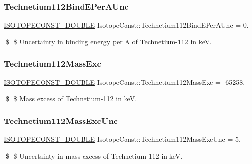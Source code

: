 \subsubsection{\texorpdfstring{Technetium112\+Bind\+E\+Per\+A\+Unc}{Technetium112BindEPerAUnc}}
{\footnotesize\ttfamily \mbox{\hyperlink{group___isotope_const-_macros_ga8f45a7272ce02c0b4c65c44636ed719a}{I\+S\+O\+T\+O\+P\+E\+C\+O\+N\+S\+T\+\_\+\+D\+O\+U\+B\+LE}} Isotope\+Const\+::\+Technetium112\+Bind\+E\+Per\+A\+Unc = 0.}

\$ \$ Uncertainty in binding energy per A of Technetium-\/112 in keV. \mbox{\label{group___isotope_const-_technetium-_tc112_ga0d874ec94dfb37d8b8075a8c10d2c3a0}} 
\subsubsection{\texorpdfstring{Technetium112\+Mass\+Exc}{Technetium112MassExc}}
{\footnotesize\ttfamily \mbox{\hyperlink{group___isotope_const-_macros_ga8f45a7272ce02c0b4c65c44636ed719a}{I\+S\+O\+T\+O\+P\+E\+C\+O\+N\+S\+T\+\_\+\+D\+O\+U\+B\+LE}} Isotope\+Const\+::\+Technetium112\+Mass\+Exc = -\/65258.}

\$ \$ Mass excess of Technetium-\/112 in keV. \mbox{\label{group___isotope_const-_technetium-_tc112_ga4232a050b8974f6a4c7e061ba2bfc64f}} 
\subsubsection{\texorpdfstring{Technetium112\+Mass\+Exc\+Unc}{Technetium112MassExcUnc}}
{\footnotesize\ttfamily \mbox{\hyperlink{group___isotope_const-_macros_ga8f45a7272ce02c0b4c65c44636ed719a}{I\+S\+O\+T\+O\+P\+E\+C\+O\+N\+S\+T\+\_\+\+D\+O\+U\+B\+LE}} Isotope\+Const\+::\+Technetium112\+Mass\+Exc\+Unc = 5.}

\$ \$ Uncertainty in mass excess of Technetium-\/112 in keV. \mbox{\label{group___isotope_const-_technetium-_tc112_gacf4236d83335fb2c5a93b7d0f6b9081f}} 
